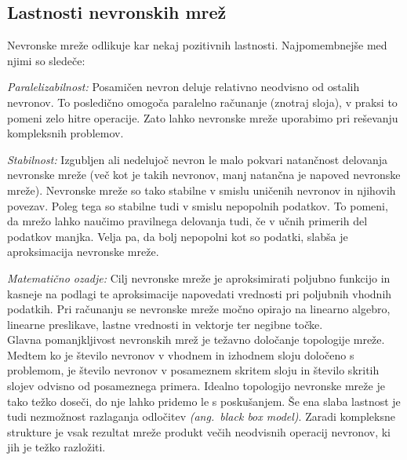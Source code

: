 \documentclass[mat1]{fmfdelo}
\begin{document}
\subsection{Lastnosti nevronskih mrež}
Nevronske mreže odlikuje kar nekaj pozitivnih lastnosti. Najpomembnejše med njimi so sledeče:

\emph{Paralelizabilnost: }Posamičen nevron deluje relativno neodvisno od ostalih nevronov. To posledično omogoča paralelno računanje (znotraj sloja), v praksi to pomeni zelo hitre operacije. Zato lahko nevronske mreže uporabimo pri reševanju kompleksnih problemov.

\emph{Stabilnost: }Izgubljen ali nedelujoč nevron le malo pokvari natančnost delovanja nevronske mreže (več kot je takih nevronov, manj natančna je napoved nevronske mreže). Nevronske mreže so tako stabilne v smislu uničenih nevronov in njihovih povezav. Poleg tega so stabilne tudi v smislu nepopolnih podatkov. To pomeni, da mrežo lahko naučimo pravilnega delovanja tudi, če v učnih primerih del podatkov manjka. Velja pa, da bolj nepopolni kot so podatki, slabša je aproksimacija nevronske mreže.

\emph{Matematično ozadje: }Cilj nevronske mreže je aproksimirati poljubno funkcijo in kasneje na podlagi te aproksimacije napovedati vrednosti pri poljubnih vhodnih podatkih. Pri računanju se nevronske mreže močno opirajo na linearno algebro, linearne preslikave, lastne vrednosti in vektorje ter negibne točke.\\

Glavna pomanjkljivost nevronskih mrež je težavno določanje topologije mreže. Medtem ko je število nevronov v vhodnem in izhodnem sloju določeno s problemom, je število nevronov v posameznem skritem sloju in število skritih slojev odvisno od posameznega primera. Idealno topologijo nevronske mreže je tako težko doseči, do nje lahko pridemo le s poskušanjem. Še ena slaba lastnost je tudi nezmožnost razlaganja odločitev \emph{(ang.~black box model)}. Zaradi kompleksne strukture je vsak rezultat mreže produkt večih neodvisnih operacij nevronov, ki jih je težko razložiti.
%
%
\end{document}
